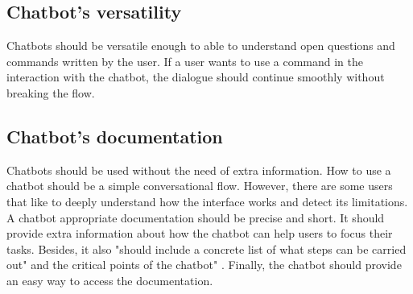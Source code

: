 \documentclass[a4paper,10pt]{article}
\begin{document}
\subsection*{Chatbot's versatility}

Chatbots should be versatile enough to able to understand open questions and commands written by the user. If a user wants to use a command in the interaction with the chatbot, the dialogue should continue smoothly without breaking the flow. 

\subsection*{Chatbot's documentation}

Chatbots should be used without the need of extra information. How to use a chatbot should be a simple conversational flow. However, there are some users that like to deeply understand how the interface works and detect its limitations. A chatbot appropriate documentation should be precise and short. It should provide extra information about how the chatbot can help users to focus their tasks. Besides, it also "should include a concrete list of what steps can be carried out" and the critical points of the chatbot" \cite{HeuristicsWebPage}. Finally, the chatbot should provide an easy way to access the documentation.   


\medskip


\end{document}
